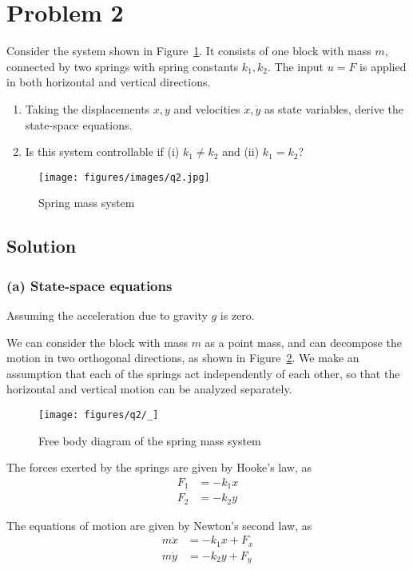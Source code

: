 \section*{Problem 2}

Consider the system shown in Figure~\ref{fig:q2}.
It consists of one block with mass \( m \), connected by two springs with spring constants \( k_{1}, k_{2} \).
The input \( u=F \) is applied in both horizontal and vertical directions.
\begin{enumerate}[label= (\alph*), topsep=3pt, itemsep=-0.2em]
    \item Taking the displacements \( x, y \) and velocities \( \dot{x}, \dot{y} \) as state variables, derive the state-space equations.
    \item Is this system controllable if (i) \( k_{1} \neq k_{2} \) and (ii) \( k_{1}=k_{2} \)?
\end{enumerate}
\begin{figure}[h]
    \centering
    \texttt{[image: figures/images/q2.jpg]}
    \caption{
        Spring mass system
    }\label{fig:q2}
\end{figure}
\vspace*{-2.5em}

\subsection*{Solution}

\subsubsection*{(a) State-space equations}

Assuming the acceleration due to gravity \( g \) is zero.

We can consider the block with mass \( m \) as a point mass, and can decompose the motion in two orthogonal directions, as shown in Figure~\ref{fig:q2-decomposition}.
We make an assumption that each of the springs act independently of each other, so that the horizontal and vertical motion can be analyzed separately.

\begin{figure}[h]
    \centering
    \texttt{[image: figures/q2/\_]}
    \caption{
        Free body diagram of the spring mass system
    }\label{fig:q2-decomposition}
\end{figure}

The forces exerted by the springs are given by Hooke's law, as
\begin{align*}
    F_{1}
     & = -k_{1}x
    \\
    F_{2}
     & = -k_{2}y
\end{align*}

The equations of motion are given by Newton's second law, as
\begin{align*}
    m\ddot{x}
     & = -k_{1}x + F_{x}
    \\
    m\ddot{y}
     & = -k_{2}y + F_{y}
\end{align*}
